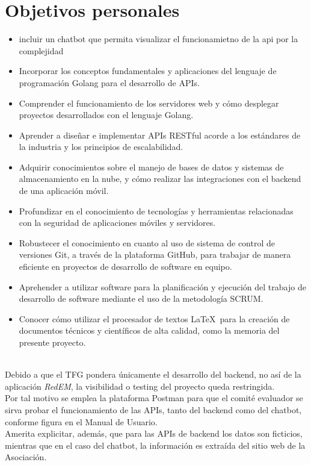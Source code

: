\section{Objetivos personales}
\begin{itemize}
\item incluir un chatbot que permita visualizar el funcionamietno de la api por la complejidad 
    \item Incorporar los conceptos fundamentales y aplicaciones del lenguaje de programación Golang para el desarrollo de APIs.
    \item Comprender el funcionamiento de los servidores web y cómo desplegar proyectos desarrollados con el lenguaje Golang.
    \item Aprender a diseñar e implementar APIs RESTful acorde a los estándares de la industria y los principios de escalabilidad.
    \item Adquirir conocimientos sobre el manejo de bases de datos y sistemas de almacenamiento en la nube, y cómo realizar las integraciones con el backend de una aplicación móvil.
    \item Profundizar en el conocimiento de tecnologías y herramientas relacionadas con la seguridad de aplicaciones móviles y servidores.
    \item Robustecer el conocimiento en cuanto al uso de sistema de control de versiones Git, a través de la plataforma GitHub, para trabajar de manera eficiente en proyectos de desarrollo de software en equipo.
   \item Aprehender a utilizar software para la planificación y ejecución del trabajo de desarrollo de software mediante el uso de la metodología SCRUM.
    \item Conocer cómo utilizar el procesador de textos \LaTeX\ para la creación de documentos técnicos y científicos de alta calidad, como la memoria del presente proyecto.   
\end{itemize} 

\newcommand{\graybox}[2]{%
    \colorbox{gray!20}{%
        \parbox{\dimexpr\linewidth-2\fboxsep}{%
            \colorbox{black}{\textcolor{white}{\textbf{\makebox[\dimexpr\linewidth-2\fboxsep]{#1}}}}\vspace{4pt}%
            \hspace{\parindent}#2%
        }%
    }%
}

\graybox{A considerar:}{\\Debido a que el TFG pondera únicamente el desarrollo del backend, no así de la aplicación \emph{RedEM}, la visibilidad o testing del proyecto queda restringida. \\Por tal motivo se emplea la plataforma Postman para que el comité evaluador se sirva probar el funcionamiento de las APIs, tanto del backend como del chatbot, conforme figura en el Manual de Usuario. \\
Amerita explicitar, además, que para las APIs de backend los datos son ficticios, mientras que en el caso del chatbot, la información es extraída del sitio web de la Asociación.}



